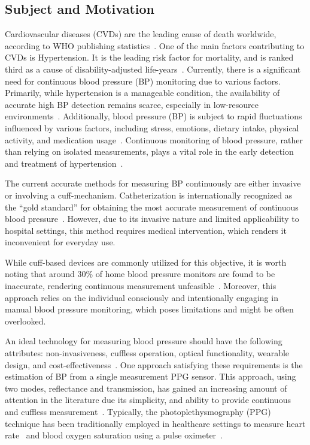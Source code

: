 \subsection{Subject and Motivation}
\label{subsec:subject_motivation}

Cardiovascular diseases (CVDs) are the leading cause of death worldwide, according to WHO publishing statistics~\cite{organizationWorldHealthStatistics2023}.
One of the main factors contributing to CVDs is Hypertension.
It is the leading risk factor for mortality, and is ranked third as a cause of disability-adjusted life-years~\cite{ezzatiSelectedMajorRisk2002}.
Currently, there is a significant need for continuous blood pressure (BP) monitoring due to various factors.
Primarily, while hypertension is a manageable condition, the availability of accurate high BP detection remains scarce, especially in low-resource environments~\cite{burtPrevalenceHypertensionUS1995}.
Additionally, blood pressure (BP) is subject to rapid fluctuations influenced by various factors, including stress, emotions, dietary intake, physical activity, and medication usage~\cite{poonCufflessNoninvasiveMeasurements2005}.
Continuous monitoring of blood pressure, rather than relying on isolated measurements, plays a vital role in the early detection and treatment of hypertension~\cite{el-hajjDeepLearningModels2021}.

The current accurate methods for measuring BP continuously are either invasive or involving a cuff-mechanism.
Catheterization is internationally recognized as the \enquote{gold standard} for obtaining the most accurate measurement of continuous blood pressure~\cite{sharmaCuffLessContinuousBlood2017}.
However, due to its invasive nature and limited applicability to hospital settings, this method requires medical intervention, which renders it inconvenient for everyday use.

While cuff-based devices are commonly utilized for this objective, it is worth noting that around 30\% of home blood pressure monitors are found to be inaccurate, rendering continuous measurement unfeasible~\cite{leungHypertensionCanada20162016, seboBloodPressureMeasurements2014}.
Moreover, this approach relies on the individual consciously and intentionally engaging in manual blood pressure monitoring, which poses limitations and might be often overlooked.

An ideal technology for measuring blood pressure should have the following attributes: non-invasiveness, cuffless operation, optical functionality, wearable design, and cost-effectiveness~\cite{el-hajjDeepLearningModels2021}.
One approach satisfying these requirements is the estimation of BP from a single measurement PPG sensor.
This approach, using two modes, reflectance and transmission, has gained an increasing amount of attention in the literature due its simplicity, and ability to provide continuous and cuffless measurement~\cite{el-hajjDeepLearningModels2021}.
Typically, the photoplethysmography (PPG) technique has been traditionally employed in healthcare settings to measure heart rate~\cite{reyesWirelessPhotoplethysmographicDevice2012} and blood oxygen saturation using a pulse oximeter~\cite{yoonMultipleDiagnosisBased2002}.


